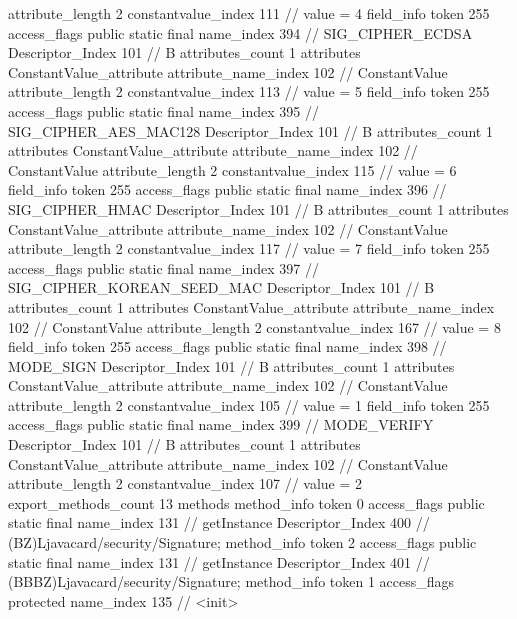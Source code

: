 {{{{{{{					attribute_length	2
					constantvalue_index	111		// value = 4
				}
				}
			}
			field_info {
				token	255
				access_flags	public static final
				name_index	394		// SIG_CIPHER_ECDSA
				Descriptor_Index	101		// B
				attributes_count	1
				attributes {
				ConstantValue_attribute {
					attribute_name_index	102		// ConstantValue
					attribute_length	2
					constantvalue_index	113		// value = 5
				}
				}
			}
			field_info {
				token	255
				access_flags	public static final
				name_index	395		// SIG_CIPHER_AES_MAC128
				Descriptor_Index	101		// B
				attributes_count	1
				attributes {
				ConstantValue_attribute {
					attribute_name_index	102		// ConstantValue
					attribute_length	2
					constantvalue_index	115		// value = 6
				}
				}
			}
			field_info {
				token	255
				access_flags	public static final
				name_index	396		// SIG_CIPHER_HMAC
				Descriptor_Index	101		// B
				attributes_count	1
				attributes {
				ConstantValue_attribute {
					attribute_name_index	102		// ConstantValue
					attribute_length	2
					constantvalue_index	117		// value = 7
				}
				}
			}
			field_info {
				token	255
				access_flags	public static final
				name_index	397		// SIG_CIPHER_KOREAN_SEED_MAC
				Descriptor_Index	101		// B
				attributes_count	1
				attributes {
				ConstantValue_attribute {
					attribute_name_index	102		// ConstantValue
					attribute_length	2
					constantvalue_index	167		// value = 8
				}
				}
			}
			field_info {
				token	255
				access_flags	public static final
				name_index	398		// MODE_SIGN
				Descriptor_Index	101		// B
				attributes_count	1
				attributes {
				ConstantValue_attribute {
					attribute_name_index	102		// ConstantValue
					attribute_length	2
					constantvalue_index	105		// value = 1
				}
				}
			}
			field_info {
				token	255
				access_flags	public static final
				name_index	399		// MODE_VERIFY
				Descriptor_Index	101		// B
				attributes_count	1
				attributes {
				ConstantValue_attribute {
					attribute_name_index	102		// ConstantValue
					attribute_length	2
					constantvalue_index	107		// value = 2
				}
				}
			}
			}
			export_methods_count	13
			methods {
				method_info {
					token	0
					access_flags	public static final
					name_index	131		// getInstance
					Descriptor_Index	400		// (BZ)Ljavacard/security/Signature;
				}
				method_info {
					token	2
					access_flags	public static final
					name_index	131		// getInstance
					Descriptor_Index	401		// (BBBZ)Ljavacard/security/Signature;
				}
				method_info {
					token	1
					access_flags	protected
					name_index	135		// <init>
}}}}}
